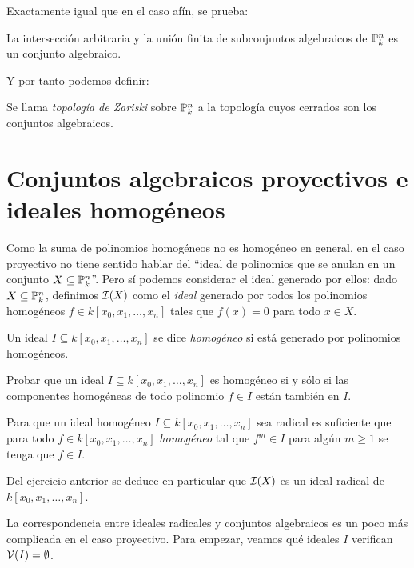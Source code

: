 \documentclass[ACGA.tex]{subfiles}
\begin{document}
Exactamente igual que en el caso afín, se prueba:

\begin{prop}
  La intersección arbitraria y la unión finita de subconjuntos algebraicos de $\mathbb{P}^n_k$ es un conjunto algebraico.
\end{prop}

Y por tanto podemos definir:

\begin{defi}
 Se llama \emph{topología de Zariski} sobre $\mathbb{P}^n_k$ a la topología cuyos cerrados son los conjuntos algebraicos.
\end{defi}

\section{Conjuntos algebraicos proyectivos e ideales homogéneos}

Como la suma de polinomios homogéneos no es homogéneo en general, en el caso proyectivo no tiene sentido hablar del ``ideal de polinomios que se anulan en un conjunto $X\subseteq\mathbb{P}^n_k$''. Pero sí podemos considerar el ideal generado por ellos: dado $X\subseteq\mathbb{P}^n_k$, definimos $\mathcal{I}(X)$ como el \emph{ideal} generado por todos los polinomios homogéneos $f\in k[x_0,x_1,\ldots,x_n]$ tales que $f(x)=0$ para todo $x\in X$. 

\begin{defi}
 Un ideal $I\subseteq k[x_0,x_1,\ldots,x_n]$ se dice \emph{homogéneo} si está generado por polinomios homogéneos.
\end{defi}

\begin{ejer}
 Probar que un ideal $I\subseteq k[x_0,x_1,\ldots,x_n]$ es homogéneo si y sólo si las componentes homogéneas de todo polinomio $f\in I$ están también en $I$.
\end{ejer}

\begin{ejer}
 Para que un ideal homogéneo $I\subseteq k[x_0,x_1,\ldots,x_n]$ sea radical es suficiente que para todo $f\in k[x_0,x_1,\ldots,x_n]$ \emph{homogéneo} tal que $f^m\in I$ para algún $m\geq 1$ se tenga que $f\in I$. 
\end{ejer}

Del ejercicio anterior se deduce en particular que $\mathcal{I}(X)$ es un ideal radical de $k[x_0,x_1,\ldots,x_n]$.

 La correspondencia entre ideales radicales y conjuntos algebraicos es un poco más complicada en el caso proyectivo. Para empezar, veamos qué ideales $I$ verifican $\mathcal{V}(I)=\emptyset$.
\end{document}
